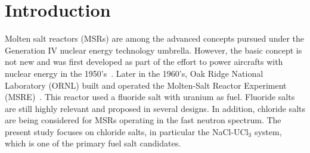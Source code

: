 \documentclass[preprint,3p,10pt,onecolumn,number,sort&compress]{elsarticle}
\begin{document}
\section{Introduction}
\label{sec:intro}
Molten salt reactors (MSRs) are among the advanced concepts pursued under the Generation IV nuclear energy technology umbrella. However, the basic concept is not new and was first developed as part of the effort to power aircrafts with nuclear energy in the 1950's~\cite{Rosenthal}. Later in the 1960's, Oak Ridge National Laboratory (ORNL) built and operated the Molten-Salt Reactor Experiment (MSRE)~\cite{MSRE1,MSRE2}. This reactor used a fluoride salt with uranium as fuel. Fluoride salts are still highly relevant and proposed in several designs. In addition, chloride salts are being considered for MSRs operating in the fast neutron spectrum. The present study focuses on chloride salts, in particular the NaCl-UCl$_3$ system, which is one of the primary fuel salt candidates.

\end{document}
